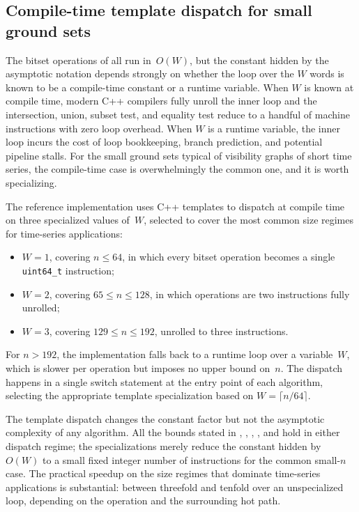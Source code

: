 \documentclass[11pt,a4paper]{article}
\theoremstyle{plain}
\theoremstyle{definition}
\begin{document}

\subsection{Compile-time template dispatch for small ground sets}%
\label{subsec:template-dispatch}

The bitset operations of  all run in~$O(W)$, but the
constant hidden by the asymptotic notation depends strongly on whether the
loop over the $W$ words is known to be a compile-time constant or a runtime
variable.  When $W$ is known at compile time, modern C++ compilers fully
unroll the inner loop and the intersection, union, subset test, and
equality test reduce to a handful of machine instructions with zero loop
overhead.  When $W$ is a runtime variable, the inner loop incurs the cost
of loop bookkeeping, branch prediction, and potential pipeline stalls.
For the small ground sets typical of visibility graphs of short time
series, the compile-time case is overwhelmingly the common one, and it is
worth specializing.

The reference implementation uses C++ templates to dispatch at compile time
on three specialized values of~$W$, selected to cover the most common size
regimes for time-series applications:
\begin{itemize}[leftmargin=2em]
  \item $W = 1$, covering $n \leq 64$, in which every bitset operation
        becomes a single \texttt{uint64\_t} instruction;
  \item $W = 2$, covering $65 \leq n \leq 128$, in which operations are two
        instructions fully unrolled;
  \item $W = 3$, covering $129 \leq n \leq 192$, unrolled to three
        instructions.
\end{itemize}
For $n > 192$, the implementation falls back to a runtime loop over a
variable~$W$, which is slower per operation but imposes no upper bound
on~$n$.  The dispatch happens in a single switch statement at the entry
point of each algorithm, selecting the appropriate template specialization
based on $W = \lceil n / 64 \rceil$.

The template dispatch changes the constant factor but not the asymptotic
complexity of any algorithm.  All the bounds stated in
,
,
,
, and  hold in
either dispatch regime; the specializations merely reduce the constant
hidden by $O(W)$ to a small fixed integer number of instructions for the
common small-$n$ case.  The practical speedup on the size regimes that
dominate time-series applications is substantial: between threefold and
tenfold over an unspecialized loop, depending on the operation and the
surrounding hot path.
\end{document}
